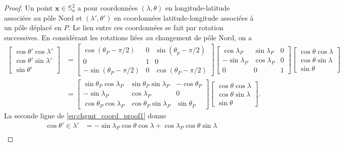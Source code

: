\begin{proof}
Un point $\mathbf{x} \in \mathbb{S}_a^2$ a pour coordonnées $(\lambda, \theta)$ en longitude-latitude associées au pôle Nord et $(\lambda', \theta')$ en coordonnées latitude-longitude associées à un pôle déplacé en $P$. Le lien entre ces coordonnées se fait par rotation successives.
En considérant les rotations liées au changement de pôle Nord, on a
\begin{align}
\begin{bmatrix}
\cos \theta' \cos \lambda' \\ \cos \theta' \sin \lambda' \\ \sin \theta'
\end{bmatrix} & = 
\begin{bmatrix}
\cos (\theta_P - \pi/2) & 0 & \sin (\theta_p - \pi/2) \\
0 & 1 & 0 \\
- \sin (\theta_P - \pi/2 ) & 0 & \cos (\theta_P - \pi/2)
\end{bmatrix}
\begin{bmatrix}
\cos \lambda_P & \sin \lambda_P & 0 \\
- \sin \lambda_P & \cos \lambda_P & 0 \\
0 & 0 & 1 
\end{bmatrix}
\begin{bmatrix}
\cos \theta \cos \lambda \\ \cos \theta \sin \lambda \\ \sin \theta
\end{bmatrix} \\
& = \begin{bmatrix}
\sin \theta_P \cos \lambda_P & \sin \theta_P \sin \lambda_P & - \cos \theta_P \\
- \sin \lambda_P & \cos \lambda_P & 0 \\
\cos \theta_P \cos \lambda_P & \cos \theta_P \sin \lambda_P & \sin \theta_P
\end{bmatrix}
\begin{bmatrix}
\cos \theta \cos \lambda \\ \cos \theta \sin \lambda \\ \sin \theta
\end{bmatrix}.
\label{eq:chgmt_coord_proof1}
\end{align}
La seconde ligne de \eqref{eq:chgmt_coord_proof1} donne
\begin{align*}
\cos \theta' \in \lambda'  & = - \sin \lambda_P \cos \theta \cos \lambda + \cos \lambda_P \cos \theta \sin \lambda \\

\end{align*}
\end{proof}
